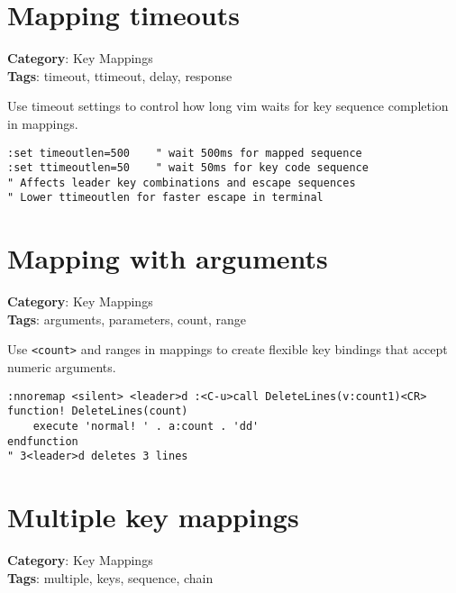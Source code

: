 \section{Mapping timeouts}

\textbf{Category}: Key Mappings\\ \textbf{Tags}: timeout, ttimeout, delay, response
\vspace{0.5cm}

Use timeout settings to control how long vim waits for key sequence completion in mappings.

\begin{Exa*}{}
\begin{Verbatim}[fontsize=\footnotesize, breaklines, breakanywhere]
:set timeoutlen=500    " wait 500ms for mapped sequence
:set ttimeoutlen=50    " wait 50ms for key code sequence
" Affects leader key combinations and escape sequences
" Lower ttimeoutlen for faster escape in terminal
\end{Verbatim}
\end{Exa*}

\section{Mapping with arguments}

\textbf{Category}: Key Mappings\\ \textbf{Tags}: arguments, parameters, count, range
\vspace{0.5cm}

Use {\footnotesize \Verb§<count>§} and ranges in mappings to create flexible key bindings that accept numeric arguments.

\begin{Exa*}{}
\begin{Verbatim}[fontsize=\footnotesize, breaklines, breakanywhere]
:nnoremap <silent> <leader>d :<C-u>call DeleteLines(v:count1)<CR>
function! DeleteLines(count)
    execute 'normal! ' . a:count . 'dd'
endfunction
" 3<leader>d deletes 3 lines
\end{Verbatim}
\end{Exa*}

\section{Multiple key mappings}

\textbf{Category}: Key Mappings\\ \textbf{Tags}: multiple, keys, sequence, chain
\vspace{0.5cm}

